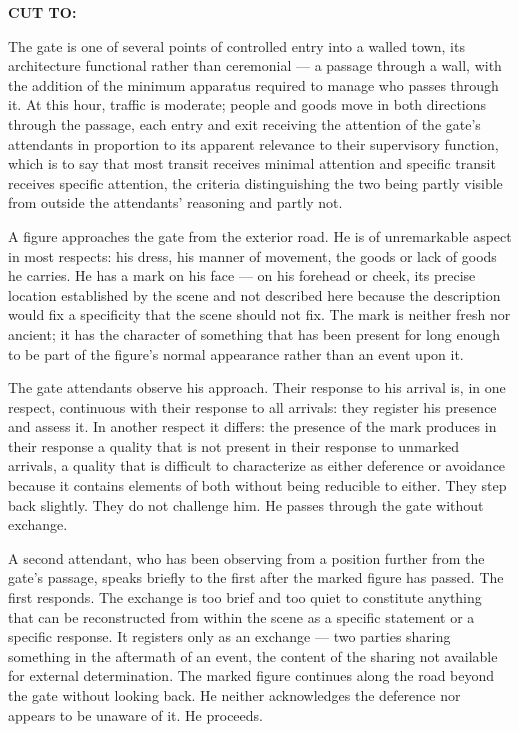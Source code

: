 \documentclass[12pt, oneside]{article}
\newcommand{\sceneheading}[1]{%
  \vspace{1.8em}%
  \noindent{\bfseries\large\MakeUppercase{#1}}%
  \vspace{0.6em}%
  \par\noindent{\color{rulecolor}\rule{\linewidth}{0.3pt}}%
  \vspace{0.5em}\par%
}
\newenvironment{action}{%
  \vspace{0.6em}%
  \noindent\ignorespaces%
}{%
  \par\vspace{0.6em}%
}
\newcommand{\scenenumber}[1]{%
  \vspace{1em}%
  \noindent{\small\bfseries\scshape Scene #1}%
  \vspace{0.3em}\par%
}
\newcommand{\transition}[1]{%
  \vspace{0.8em}%
  \begin{flushright}%
    \bfseries #1%
  \end{flushright}%
  \vspace{0.5em}%
}
\begin{document}
\transition{CUT TO:}

\scenenumber{13a — Cain's Sign}

\sceneheading{EXT. City Gate — Day}

\begin{action}
The gate is one of several points of controlled entry into a walled town, its architecture functional rather than ceremonial --- a passage through a wall, with the addition of the minimum apparatus required to manage who passes through it. At this hour, traffic is moderate; people and goods move in both directions through the passage, each entry and exit receiving the attention of the gate's attendants in proportion to its apparent relevance to their supervisory function, which is to say that most transit receives minimal attention and specific transit receives specific attention, the criteria distinguishing the two being partly visible from outside the attendants' reasoning and partly not.

A figure approaches the gate from the exterior road. He is of unremarkable aspect in most respects: his dress, his manner of movement, the goods or lack of goods he carries. He has a mark on his face --- on his forehead or cheek, its precise location established by the scene and not described here because the description would fix a specificity that the scene should not fix. The mark is neither fresh nor ancient; it has the character of something that has been present for long enough to be part of the figure's normal appearance rather than an event upon it.
\end{action}

\begin{action}
The gate attendants observe his approach. Their response to his arrival is, in one respect, continuous with their response to all arrivals: they register his presence and assess it. In another respect it differs: the presence of the mark produces in their response a quality that is not present in their response to unmarked arrivals, a quality that is difficult to characterize as either deference or avoidance because it contains elements of both without being reducible to either. They step back slightly. They do not challenge him. He passes through the gate without exchange.

A second attendant, who has been observing from a position further from the gate's passage, speaks briefly to the first after the marked figure has passed. The first responds. The exchange is too brief and too quiet to constitute anything that can be reconstructed from within the scene as a specific statement or a specific response. It registers only as an exchange --- two parties sharing something in the aftermath of an event, the content of the sharing not available for external determination. The marked figure continues along the road beyond the gate without looking back. He neither acknowledges the deference nor appears to be unaware of it. He proceeds.
\end{action}
\end{document}
